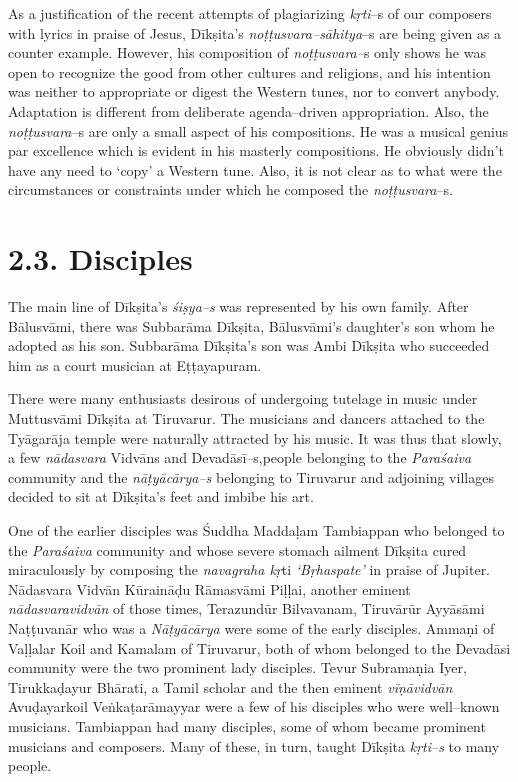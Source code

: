 As a justification of the recent attempts of plagiarizing \textit{kṛti}–s of our composers with lyrics in praise of Jesus, Dīkṣita’s \textit{noṭṭusvara–sāhitya}–s are being given as a counter example. However, his composition of \textit{noṭṭusvara–}s only shows he was open to recognize the good from other cultures and religions, and his intention was neither to appropriate or digest the Western tunes, nor to convert anybody. Adaptation is different from deliberate agenda–driven appropriation. Also, the \textit{noṭṭusvara}–s are only a small aspect of his compositions. He was a musical genius par excellence which is evident in his masterly compositions. He obviously didn’t have any need to ‘copy’ a Western tune. Also, it is not clear as to what were the circumstances or constraints under which he composed the \textit{noṭṭusvara}–s.



\section*{2.3. Disciples}

The main line of Dīkṣita’s \textit{śiṣya–s} was represented by his own family. After Bālusvāmi, there was Subbarāma Dīkṣita, Bālusvāmi’s daughter’s son whom he adopted as his son. Subbarāma Dīkṣita’s son was Ambi Dīkṣita who succeeded him as a court musician at Eṭṭayapuram.

There were many enthusiasts desirous of undergoing tutelage in music under Muttusvāmi Dīkṣita at Tiruvarur. The musicians and dancers attached to the Tyāgarāja temple were naturally attracted by his music. It was thus that slowly, a few \textit{nādasvara} Vidvāns and Devadāsī–s,\break people belonging to the \textit{Paraśaiva} community and the \textit{nāṭyācārya–s} belonging to Tiruvarur and adjoining villages decided to sit at Dīkṣita's feet and imbibe his art.

One of the earlier disciples was Śuddha Maddaḷam Tambiappan who belonged to the \textit{Paraśaiva} community and whose severe stomach ailment Dīkṣita cured miraculously by composing the \textit{navagraha kṛ}ti\textit{ ‘Bṛhaspate’} in praise of Jupiter. Nādasvara Vidvān Kūraināḍu Rāmasvāmi Piḷḷai, another eminent \textit{nādasvaravidvān} of those times, Terazundūr Bilvavanam, Tiruvārūr Ayyāsāmi Naṭṭuvanār who was a \textit{Nāṭyācārya} were some of the early disciples. Ammaṇi of Vaḷḷalar Koil and Kamalam of Tiruvarur, both of whom belonged to the Devadāsi community were the two prominent lady disciples. Tevur Subramaṇia Iyer, Tirukkaḍayur Bhārati, a Tamil scholar and the then eminent \textit{vīṇāvidvān} Avuḍayarkoil Veṅkaṭarāmayyar were a few of his disciples who were well–known musicians. Tambiappan had many disciples, some of whom became prominent musicians and composers. Many of these, in turn, taught Dīkṣita \textit{kṛti–s} to many people.

